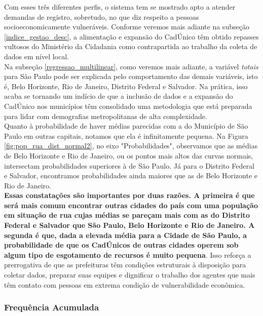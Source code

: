 \documentclass[14pt]{extarticle}
\begin{document}
Com esses três diferentes perfis, o sistema tem se mostrado apto a atender demandas de registro, sobretudo, no que diz respeito a pessoas socioeconomicamente vulneráveis. Conforme veremos mais adiante na subseção \ref{indice_gestao_desc}, a alimentação e expansão do CadÚnico têm obtido repasses vultosos do Ministério da Cidadania como contrapartida ao trabalho da coleta de dados em nível local.\\

Na subseção \ref{regressao_multilinear}, como veremos mais adiante, a variável \textit{totais} para São Paulo pode ser explicada pelo comportamento das demais variáveis, isto é, Belo Horizonte, Rio de Janeiro, Distrito Federal e Salvador. Na prática, isso acaba se tornando um indício de que a inclusão de dados e a expansão do CadÚnico nos municípios têm consolidado uma metodologia que está preparada para lidar com demografias metropolitanas de alta complexidade.\\

Quanto à probabilidade de haver médias parecidas com a do Município de São Paulo em outras capitais, notamos que ela é infinitamente pequena. Na Figura \ref{fig:pop_rua_dist_normal2}, no eixo "Probabilidades", observamos que as médias de Belo Horizonte e Rio de Janeiro, ou os pontos mais altos das curvas normais, intersectam probabilidades superiores à de São Paulo. Já para o Distrito Federal e Salvador, encontramos probabilidades ainda maiores que as de Belo Horizonte e Rio de Janeiro.\\ 

\textbf{Essas constatações são importantes por duas razões. A primeira é que será mais comum encontrar outras cidades do país com uma população em situação de rua cujas médias se pareçam mais com as do Distrito Federal e Salvador que São Paulo, Belo Horizonte e Rio de Janeiro. A segunda é que, dada a elevada média para a Cidade de São Paulo, a probabilidade de que os CadÚnicos de outras cidades operem sob algum tipo de esgotamento de recursos é muito pequena}. Isso reforça a prerrogativa de que as prefeituras têm condições estruturais à disposição para coletar dados, preparar suas equipes e dignificar o trabalho dos agentes que mais têm contato com pessoas em extrema condição de vulnerabilidade econômica.\\   


\subsubsection{Frequência Acumulada}  
\label{frequência_acumulada}
\end{document}
